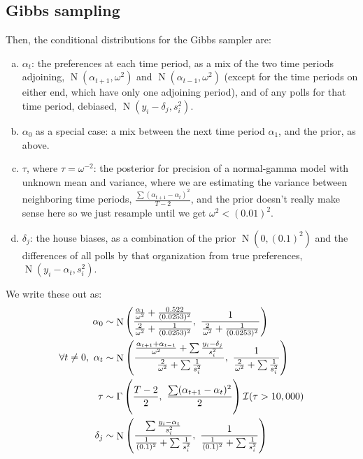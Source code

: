 \documentclass[12pt]{article}
\DeclareMathOperator{\N}{N}
\begin{document}
\subsection*{Gibbs sampling}
Then, the conditional distributions for the Gibbs sampler are:
\begin{enumerate}[(a)]
	\item $\alpha_t$: the preferences at each time period, as a mix of the two time periods adjoining, $\N(\alpha_{t+1}, \omega^2)$ and $\N(\alpha_{t-1}, \omega^2)$ (except for the time periods on either end, which have only one adjoining period), and of any polls for that time period, debiased, $\N(y_i - \delta_j, s_i^2)$.

	\item $\alpha_0$ as a special case: a mix between the next time period $\alpha_1$, and the prior, as above.
		
	\item $\tau$, where $\tau = \omega^{-2}$: the posterior for precision of a normal-gamma model with unknown mean and variance, where we are estimating the variance between neighboring time periods, $\frac{\sum(\alpha_{t+1} - \alpha_t)^2}{T-2}$, and the prior doesn't really make sense here so we just resample until we get $\omega^2 < (0.01)^2$.
	
	\item $\delta_j$: the house biases, as a combination of the prior $\N(0, (0.1)^2)$ and the differences of all polls by that organization from true preferences, $\N(y_i - \alpha_t, s_i^2)$.
\end{enumerate}
We write these out as:
\begin{align*}
\alpha_0 &\sim \N\left(\frac{  \frac{\alpha_{1}}{\omega^2} + \frac{0.522}{(0.0253)^2}}{ \frac{2}{\omega^2} + \frac{1}{(0.0253)^2} }, \text{~} \frac{1}{\frac{2}{\omega^2} + \frac{1}{(0.0253)^2}}\right) \\
\forall t \ne 0,\text{ } \alpha_t &\sim \N\left(\frac{  \frac{\alpha_{t+1} + \alpha_{t-1}}{\omega^2} + \sum\frac{y_i - \delta_j}{s_i^2}}{ \frac{2}{\omega^2} + \sum\frac{1}{s_i^2} }, \text{~} \frac{1}{\frac{2}{\omega^2} + \sum\frac{1}{s_i^2}}\right) \\
\tau &\sim \Gamma\left(
\frac{T-2}{2}
, \text{~}
\frac{\sum(\alpha_{t+1} - \alpha_{t})^2}{2}
\vphantom{\frac{  \frac{\alpha_{t+1} + \alpha_{t-1}}{\omega^2} + \sum\frac{y_i - \delta_j}{s_i^2}}{ \frac{2}{\omega^2} + \sum\frac{1}{s_i^2} }, \text{~} \frac{1}{\frac{2}{\omega^2} + \sum\frac{1}{s_i^2}}}
%
\right) \mathcal{I}(\tau > 10,000) \\
\delta_j &\sim \N\left(\frac{ \sum\frac{y_i - \alpha_t}{s_i^2}}{\frac{1}{(0.1)^2} + \sum \frac{1}{s_i^2}}, \text{~} \frac{1}{ \frac{1}{(0.1)^2} + \sum \frac{1}{s_i^2}}
\vphantom{\frac{  \frac{\alpha_{t+1} + \alpha_{t-1}}{\omega^2} + \sum\frac{y_i - \delta_j}{s_i^2}}{ \frac{2}{\omega^2} + \sum\frac{1}{s_i^2} }, \text{~} \frac{1}{\frac{2}{\omega^2} + \sum\frac{1}{s_i^2}}}
%
\right)
\end{align*}
\end{document}
